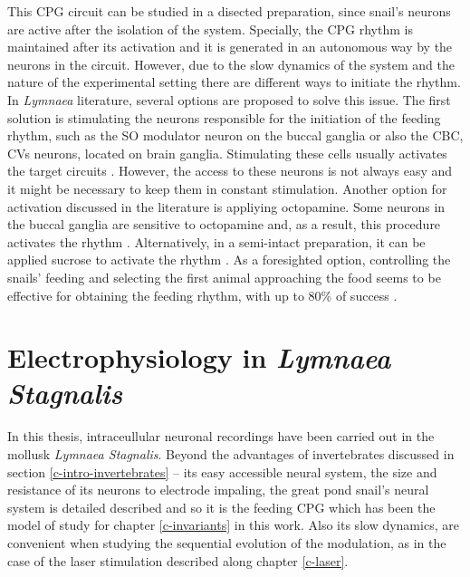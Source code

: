 This CPG circuit can be studied in a disected preparation, since snail's neurons are active after the isolation of the system. Specially, the CPG rhythm is maintained after its activation and it is generated in an autonomous way by the neurons in the circuit. However, due to the slow dynamics of the system and the nature of the experimental setting there are different ways to initiate the rhythm. In \textit{Lymnaea} literature, several options are proposed to solve this issue. The first solution is stimulating the neurons responsible for the initiation of the feeding rhythm, such as the SO modulator neuron on the buccal ganglia or also the CBC, CVs neurons, located on brain ganglia. Stimulating these cells usually activates the target circuits \cite{benjamin_distributed_2012}. However, the access to these neurons is not always easy and it might be necessary to keep them in constant stimulation. Another option for activation discussed in the literature is appliying octopamine. Some neurons in the buccal ganglia are sensitive to octopamine and, as a result, this procedure activates the rhythm \cite{vehovszky_octopamine-containing_2004}. Alternatively, in a semi-intact preparation, it can be applied sucrose to activate the rhythm \cite{vavoulis_computational_2007,vehovszky_octopamine-containing_2004,straub_endogenous_2002}. As a foresighted option, controlling the snails' feeding and selecting the first animal approaching the food seems to be effective for obtaining the feeding rhythm, with up to 80\% of success \cite{Elliott1991}.




\section{Electrophysiology in \textit{Lymnaea Stagnalis}}

\label{subsec:preparation}
In this thesis, intraceullular neuronal recordings have been carried out in the mollusk \textit{Lymnaea Stagnalis}. Beyond the advantages of invertebrates discussed in section \ref{c-intro-invertebrates} -- its easy accessible neural system, the size and resistance of its neurons to electrode impaling, the great pond snail's neural system is detailed described and so it is the feeding CPG which has been the model of study for chapter \ref{c-invariants} in this work. Also its slow dynamics, are convenient when studying the sequential evolution of the modulation, as in the case of the laser stimulation described along chapter \ref{c-laser}. 

